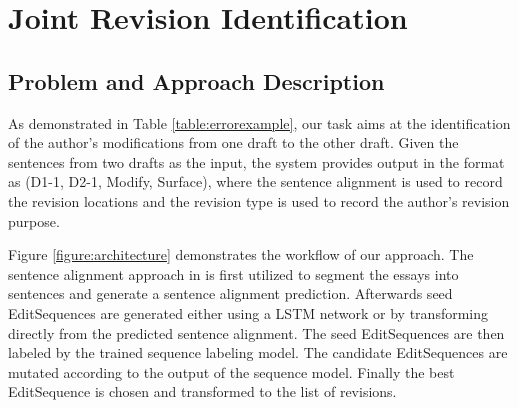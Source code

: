 \documentclass[11pt]{article}
\begin{document}



\section{Joint Revision Identification}
\subsection{Problem and Approach Description}
As demonstrated in Table \ref{table:errorexample}, our task aims at the identification of the author's modifications from one draft to the other draft. Given the sentences from two drafts as the input, the system provides output in the format as (D1-1, D2-1, Modify, Surface), where the sentence alignment is used to record the revision locations and the revision type is used to record the author's revision purpose.  

Figure \ref{figure:architecture} demonstrates the workflow of our approach. The sentence alignment approach in \cite{zhang-litman:2014:W14-18} is first utilized to segment the essays into sentences and generate a sentence alignment prediction. Afterwards seed EditSequences are generated either using a LSTM network or by transforming directly from the predicted sentence alignment. The seed EditSequences are then labeled by the trained sequence labeling model. The candidate EditSequences are mutated according to the output of the sequence model. Finally the best EditSequence is chosen and transformed to the list of revisions. 
\end{document}

